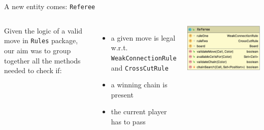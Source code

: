 \documentclass{beamer}
\begin{document}
\begin{frame}{A new entity comes: \texttt{Referee}}
 \begin{columns}
  Given the logic of a valid move in \texttt{Rules} package, our aim was to group together all the methods needed to check if:
  \vspace{0.4cm}
  \begin{itemize}
   \item a given move is legal w.r.t. \texttt{WeakConnectionRule} and \texttt{CrossCutRule}
   \vspace{0.25cm}
   \item a winning chain is present
   \vspace{0.25cm}
   \item the current player has to pass
  \end{itemize}
  
  
  \includegraphics[scale=0.27]{images/referee-class.jpg}
  
 \end{columns}
\end{frame}
\end{document}
